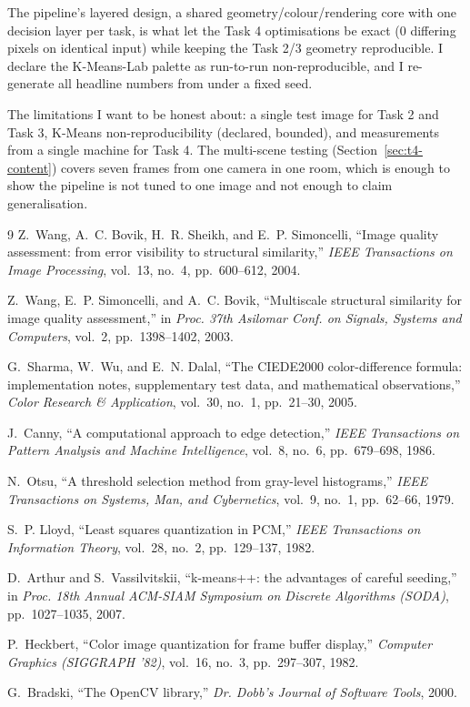 \documentclass[11pt,a4paper]{article}
\begin{document}
The pipeline's layered design, a shared geometry/colour/rendering core with one
decision layer per task, is what let the Task 4 optimisations be exact (0
differing pixels on identical input) while keeping the Task 2/3 geometry
reproducible. I declare the K-Means-Lab palette as run-to-run non-reproducible,
and I re-generate all headline numbers from
 under a fixed seed.

The limitations I want to be honest about: a single test image for Task 2 and
Task 3, K-Means non-reproducibility (declared, bounded), and measurements from a
single machine for Task 4. The multi-scene testing (Section~\ref{sec:t4-content})
covers seven frames from one camera in one room, which is enough to show the
pipeline is not tuned to one image and not enough to claim generalisation.

\FloatBarrier
\FloatBarrier
\begin{thebibliography}{9}
Z.~Wang, A.~C. Bovik, H.~R. Sheikh, and E.~P. Simoncelli,
``Image quality assessment: from error visibility to structural similarity,''
\emph{IEEE Transactions on Image Processing}, vol.~13, no.~4, pp.~600--612, 2004.

Z.~Wang, E.~P. Simoncelli, and A.~C. Bovik,
``Multiscale structural similarity for image quality assessment,''
in \emph{Proc. 37th Asilomar Conf. on Signals, Systems and Computers},
vol.~2, pp.~1398--1402, 2003.

G.~Sharma, W.~Wu, and E.~N. Dalal,
``The CIEDE2000 color-difference formula: implementation notes, supplementary test data, and mathematical observations,''
\emph{Color Research \& Application}, vol.~30, no.~1, pp.~21--30, 2005.

J.~Canny,
``A computational approach to edge detection,''
\emph{IEEE Transactions on Pattern Analysis and Machine Intelligence}, vol.~8, no.~6, pp.~679--698, 1986.

N.~Otsu,
``A threshold selection method from gray-level histograms,''
\emph{IEEE Transactions on Systems, Man, and Cybernetics}, vol.~9, no.~1, pp.~62--66, 1979.

S.~P. Lloyd,
``Least squares quantization in PCM,''
\emph{IEEE Transactions on Information Theory}, vol.~28, no.~2, pp.~129--137, 1982.

D.~Arthur and S.~Vassilvitskii,
``k-means++: the advantages of careful seeding,''
in \emph{Proc. 18th Annual ACM-SIAM Symposium on Discrete Algorithms (SODA)},
pp.~1027--1035, 2007.

P.~Heckbert,
``Color image quantization for frame buffer display,''
\emph{Computer Graphics (SIGGRAPH '82)}, vol.~16, no.~3, pp.~297--307, 1982.

G.~Bradski,
``The OpenCV library,''
\emph{Dr. Dobb's Journal of Software Tools}, 2000.
\end{thebibliography}
\end{document}
